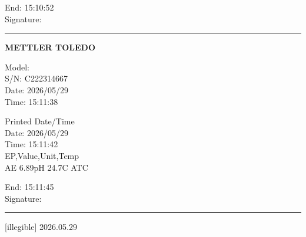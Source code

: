 \documentclass[UTF8,10pt,a4paper,fontset=fandol]{ctexart}
\newcommand{\fieldvalue}[1]{#1}
\newcommand{\handwritten}[1]{#1}
\begin{document}
\begin{minipage}[t]{0.47\linewidth}
\medskip
End: \fieldvalue{15:10:52}\\
Signature: \rule{0.72\linewidth}{0.4pt}

\vspace{1.5cm}

\textbf{METTLER TOLEDO}

\noindent
Model: \\
S/N: \fieldvalue{C222314667}\\
Date: \fieldvalue{2026/05/29}\\
Time: \fieldvalue{15:11:38}

\medskip
\noindent
Printed Date/Time\\
Date: \fieldvalue{2026/05/29}\\
Time: \fieldvalue{15:11:42}\\
EP,Value,Unit,Temp\\
\fieldvalue{AE 6.89pH 24.7\textdegree C ATC}

\medskip
End: \fieldvalue{15:11:45}\\
Signature: \rule{0.72\linewidth}{0.4pt}

\fieldvalue{\handwritten{[illegible] 2026.05.29}}
\end{minipage}
\hfill
\end{document}
